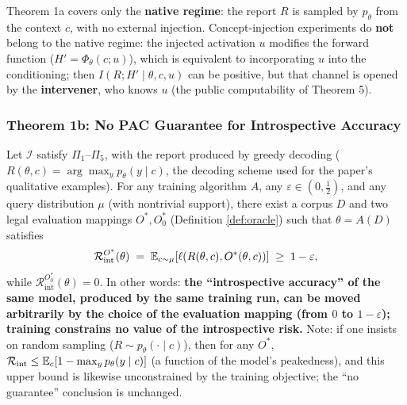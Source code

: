 \begin{remark}
Theorem 1a covers only the \textbf{native regime}: the report $R$ is sampled by $p_\theta$
from the context $c$, with no external injection. Concept-injection experiments do
\textbf{not} belong to the native regime: the injected activation $u$ modifies the forward
function ($H' = \Phi_\theta(c; u)$), which is equivalent to incorporating $u$ into the
conditioning; then $I(R; H' \mid \theta, c, u)$ can be positive, but that channel is opened
by the \textbf{intervener}, who knows $u$ (the public computability of Theorem 5).
\end{remark}

\subsubsection{Theorem 1b: No PAC Guarantee for Introspective Accuracy}

\begin{restate}[Theorem 1b]
Let $\mathcal{I}$ satisfy $\Pi_1$--$\Pi_5$, with the report produced by greedy decoding
($R(\theta,c) = \arg\max_y p_\theta(y\mid c)$, the decoding scheme used for the paper's
qualitative examples). For any training algorithm $A$, any $\varepsilon \in (0, \tfrac12)$,
and any query distribution $\mu$ (with nontrivial support), there exist a corpus $D$ and two
legal evaluation mappings $O^{*}, O^{*}_0$ (Definition \ref{def:oracle}) such that
$\theta = A(D)$ satisfies
\begin{equation}
\mathcal{R}_{\mathrm{int}}^{O^{*}}(\theta) \;=\; \mathbb{E}_{c \sim \mu}\!\left[ \ell\!\left(R(\theta,c), O^{*}(\theta,c)\right) \right]
\;\ge\; 1 - \varepsilon ,
\label{eq:a-thm1b}
\end{equation}
while $\mathcal{R}_{\mathrm{int}}^{O^{*}_0}(\theta) = 0$.
In other words: \textbf{the ``introspective accuracy'' of the same model, produced by the same
training
run, can be moved arbitrarily by the choice of the evaluation mapping (from $0$ to
$1-\varepsilon$); training constrains no value of the introspective risk.}
Note: if one insists on random sampling ($R \sim p_\theta(\cdot\mid c)$), then for any $O^{*}$,
$\mathcal{R}_{\mathrm{int}} \le \mathbb{E}_c[1 - \max_y p_\theta(y\mid c)]$ (a function of the
model's peakedness), and this upper bound is likewise unconstrained by the training objective;
the ``no guarantee'' conclusion is unchanged.
\end{restate}

